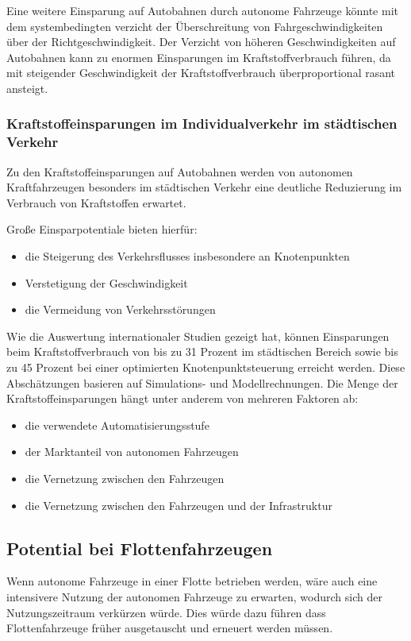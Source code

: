 Eine weitere Einsparung auf Autobahnen durch autonome Fahrzeuge könnte mit
dem systembedingten verzicht der Überschreitung von Fahrgeschwindigkeiten über der Richtgeschwindigkeit.
Der Verzicht von höheren Geschwindigkeiten auf Autobahnen kann zu enormen Einsparungen im Kraftstoffverbrauch führen,
da mit steigender Geschwindigkeit der Kraftstoffverbrauch überproportional rasant ansteigt.

\subsubsection{Kraftstoffeinsparungen im Individualverkehr im städtischen Verkehr}
Zu den Kraftstoffeinsparungen auf Autobahnen werden von
autonomen Kraftfahrzeugen besonders im städtischen Verkehr
eine deutliche Reduzierung im Verbrauch von Kraftstoffen erwartet.

Große Einsparpotentiale bieten hierfür:
\begin{itemize}
	\item die Steigerung des Verkehrsflusses insbesondere an Knotenpunkten
	\item Verstetigung der Geschwindigkeit
	\item die Vermeidung von Verkehrsstörungen
\end{itemize}

Wie die Auswertung internationaler Studien
\cite{Transportation} gezeigt hat,
können Einsparungen beim Kraftstoffverbrauch von
bis zu 31 Prozent im städtischen Bereich sowie
bis zu 45 Prozent bei einer optimierten Knotenpunktsteuerung erreicht werden.
Diese Abschätzungen basieren auf Simulations- und Modellrechnungen.
Die Menge der  Kraftstoffeinsparungen hängt unter anderem von mehreren Faktoren ab:
\begin{itemize}
	\item die verwendete Automatisierungsstufe
	\item der Marktanteil von autonomen Fahrzeugen
	\item die Vernetzung zwischen den Fahrzeugen
	\item die Vernetzung zwischen den Fahrzeugen und der Infrastruktur
\end{itemize}

\subsection{Potential bei Flottenfahrzeugen}
Wenn autonome Fahrzeuge in einer Flotte betrieben werden, wäre auch eine intensivere Nutzung der autonomen Fahrzeuge zu erwarten,
wodurch sich der Nutzungszeitraum verkürzen würde.
Dies würde dazu führen dass Flottenfahrzeuge früher ausgetauscht und erneuert werden müssen.

